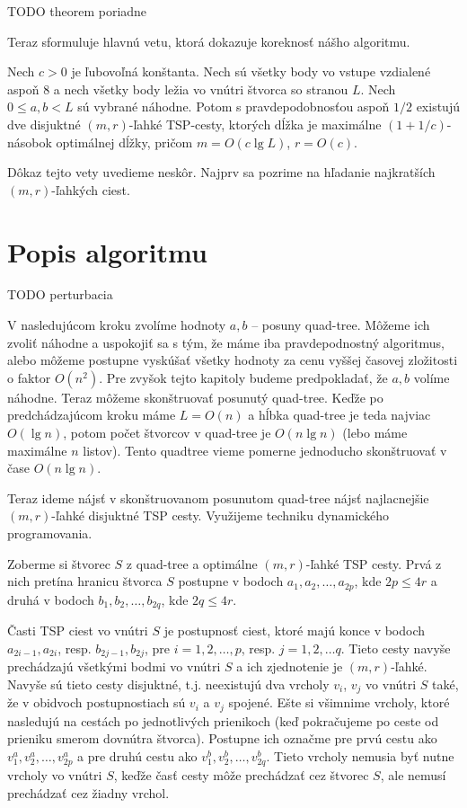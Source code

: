 TODO theorem poriadne

Teraz sformuluje hlavnú vetu, ktorá dokazuje koreknosť nášho algoritmu.

\begin{veta}
Nech $c > 0$ je ľubovoľná konštanta. Nech sú všetky body vo vstupe vzdialené aspoň $8$ a nech všetky
body ležia vo vnútri štvorca so stranou $L$. Nech $0 \leq a, b < L$ sú vybrané náhodne. Potom s
pravdepodobnosťou aspoň $1/2$ existujú dve disjuktné $(m,r)$-ľahké TSP-cesty, ktorých dĺžka je maximálne $(1 +
1/c)$-násobok optimálnej dĺžky, pričom $m = O(c \lg L)$, $r = O(c)$.
\end{veta}

Dôkaz tejto vety uvedieme neskôr. 
Najprv sa pozrime na hľadanie najkratších $(m, r)$-ľahkých ciest.

\section{Popis algoritmu}

TODO perturbacia

V nasledujúcom kroku zvolíme hodnoty $a, b$ -- posuny quad-tree. Môžeme ich zvoliť náhodne
a uspokojiť sa s tým, že máme iba pravdepodnostný algoritmus, alebo môžeme postupne vyskúšať všetky
hodnoty za cenu vyššej časovej zložitosti o faktor $O(n^2)$. Pre zvyšok tejto kapitoly budeme
predpokladať, že $a, b$ volíme náhodne. Teraz môžeme skonštruovať posunutý quad-tree. 
Keďže po predchádzajúcom kroku máme $L = O(n)$ a hĺbka quad-tree je teda najviac $O(\lg n)$, potom
počet štvorcov v quad-tree je $O(n \lg n)$ (lebo máme maximálne $n$ listov). Tento quadtree vieme
pomerne jednoducho skonštruovať v čase $O(n \lg n)$.

Teraz ideme nájsť v skonštruovanom posunutom quad-tree nájsť najlacnejšie $(m,r)$-ľahké disjuktné
TSP cesty. Využijeme techniku dynamického programovania.

Zoberme si štvorec $S$ z quad-tree a optimálne $(m,r)$-ľahké TSP cesty. Prvá z nich pretína hranicu
štvorca $S$ postupne v bodoch $a_1, a_2, \dots, a_{2p}$, kde $2p \leq 4r$ a druhá v bodoch $b_1, b_2,
\dots, b_{2q}$, kde $2q \leq 4r$. 

Časti TSP ciest vo vnútri $S$ je postupnosť ciest, ktoré majú konce v bodoch $a_{2i - 1}, a_{2i}$,
resp. $b_{2j - 1}, b_{2j}$, pre $i = 1, 2, \dots, p$, resp. $j = 1, 2, \dots q$.
Tieto cesty navyše prechádzajú všetkými bodmi vo vnútri $S$ a ich zjednotenie je $(m,r)$-ľahké.
Navyše sú tieto cesty disjuktné, t.j. neexistujú dva vrcholy $v_i$, $v_j$ vo vnútri $S$ také, že 
v obidvoch postupnostiach sú $v_i$ a $v_j$ spojené.
Ešte si všimnime vrcholy, ktoré nasledujú na cestách po jednotlivých prienikoch (keď pokračujeme po
ceste od prieniku smerom dovnútra štvorca).
Postupne ich označme pre prvú cestu ako $v^a_1, v^a_2, \dots, v^a_{2p}$ a pre druhú cestu ako
$v^b_1, v^b_2, \dots, v^b_{2q}$. Tieto vrcholy nemusia byť nutne vrcholy vo vnútri $S$, keďže časť
cesty môže prechádzať cez štvorec $S$, ale nemusí prechádzať cez žiadny vrchol.

